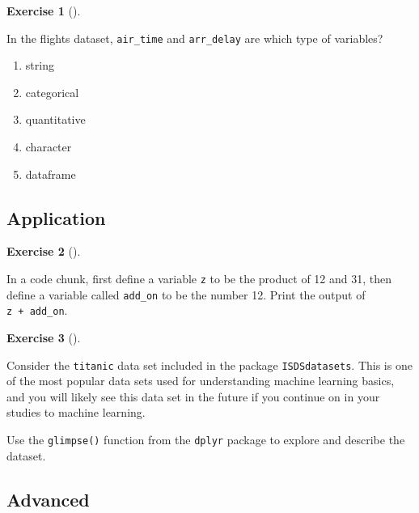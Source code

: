 \documentclass[
  letterpaper,
  DIV=11,
  numbers=noendperiod]{scrreprt}
\providecommand{\tightlist}{%
  \setlength{\itemsep}{0pt}\setlength{\parskip}{0pt}}\usepackage{longtable,booktabs,array}
\theoremstyle{definition}
\newtheorem{exercise}{Exercise}[chapter]
\theoremstyle{remark}
\begin{document}
\leavevmode{}%
\begin{exercise}[]\label{exr-ch01-c08}

In the flights dataset, \texttt{air\_time} and \texttt{arr\_delay} are
which type of variables?

\begin{enumerate}
\def\labelenumi{\alph{enumi})}
\tightlist
\item
  string
\item
  categorical
\item
  quantitative
\item
  character
\item
  dataframe
\end{enumerate}

\end{exercise}

\hypertarget{sec-ex01-application}{%
\subsection{Application}\label{sec-ex01-application}}

\leavevmode{}%
\begin{exercise}[]\label{exr-ch01-app1}

In a code chunk, first define a variable \texttt{z} to be the product of
12 and 31, then define a variable called \texttt{add\_on} to be the
number 12. Print the output of \texttt{z\ +\ add\_on}.

\end{exercise}

\leavevmode{}%
\begin{exercise}[]\label{exr-ch01-app2}

Consider the \texttt{titanic} data set included in the package
\texttt{ISDSdatasets}. This is one of the most popular data sets used
for understanding machine learning basics, and you will likely see this
data set in the future if you continue on in your studies to machine
learning.

Use the \texttt{glimpse()} function from the \texttt{dplyr} package to
explore and describe the dataset.

\end{exercise}

\hypertarget{sec-ex01-advanced}{%
\subsection{Advanced}\label{sec-ex01-advanced}}
\end{document}
